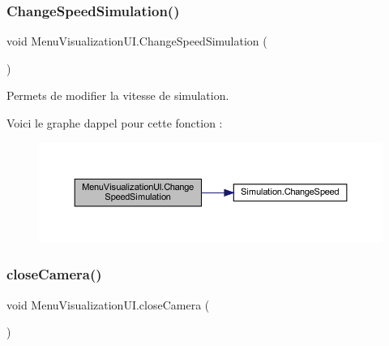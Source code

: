 \subsubsection{\texorpdfstring{Change\+Speed\+Simulation()}{ChangeSpeedSimulation()}}
{\footnotesize\ttfamily void Menu\+Visualization\+U\+I.\+Change\+Speed\+Simulation (\begin{DoxyParamCaption}{ }\end{DoxyParamCaption})\hspace{0.3cm}{\ttfamily [inline]}}



Permets de modifier la vitesse de simulation. 

Voici le graphe d\textquotesingle{}appel pour cette fonction \+:
\nopagebreak
\begin{figure}[H]
\begin{center}
\leavevmode
\includegraphics[width=350pt]{class_menu_visualization_u_i_abae4f4813543053bd5fc9d68ed4916d5_cgraph}
\end{center}
\end{figure}
\mbox{\label{class_menu_visualization_u_i_a111cf59e821c16b45f21ed35339e70d3}} 
\subsubsection{\texorpdfstring{close\+Camera()}{closeCamera()}}
{\footnotesize\ttfamily void Menu\+Visualization\+U\+I.\+close\+Camera (\begin{DoxyParamCaption}{ }\end{DoxyParamCaption})\hspace{0.3cm}{\ttfamily [inline]}}

\mbox{\label{class_menu_visualization_u_i_a262b9857eed5d1a7e749beb653a88cad}} 
